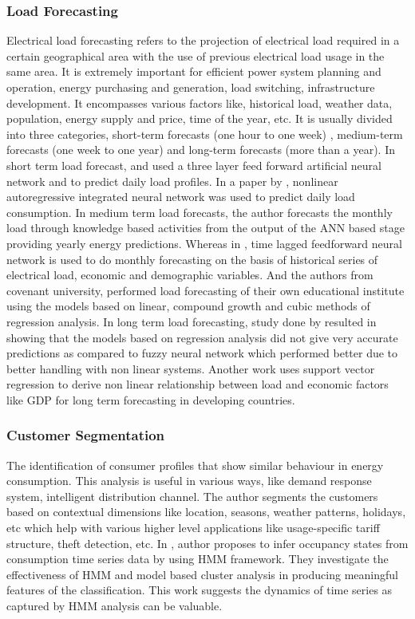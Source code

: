 \documentclass{sig-alternate}
\begin{document}
\subsubsection{Load Forecasting}
Electrical load forecasting refers to the projection of electrical load required in a certain geographical area with the use of previous electrical load usage in the same area. It is extremely important for efficient power system planning and operation, energy purchasing and generation, load switching, infrastructure development. It encompasses various factors like, historical load, weather data, population, energy supply and price, time of the year, etc.
It is usually divided into three categories, short-term forecasts (one hour to one week) , medium-term forecasts (one week to one year) and long-term forecasts (more than a year).
In short term load forecast, \cite{Bakirtzis} and \cite{Chen} used a three layer feed forward artificial neural network and to predict daily load profiles. In a paper by \cite{Chow}, nonlinear autoregressive integrated neural network was used to predict daily load consumption.
In medium term load forecasts, the author forecasts \cite{Falvo} the monthly load through knowledge based activities from the output of the ANN based stage providing yearly energy predictions. Whereas in \cite{bassi}, time lagged feedforward neural network is used to do monthly forecasting on the basis of historical series of electrical load, economic and demographic variables. And the authors from covenant university, \cite{samuel} performed load forecasting of their own educational institute using the models based on linear, compound growth and cubic methods of regression analysis.
In long term load forecasting, study done by \cite{Daneshi} resulted in showing that the models based on regression analysis did not give very accurate predictions as compared to fuzzy neural network which performed better due to better handling with non linear systems. Another work  \cite{Zhang} uses support vector regression to derive non linear relationship between load and economic factors like GDP for long term forecasting in developing countries.



\subsubsection{Customer Segmentation}
The identification of consumer profiles that show similar behaviour in energy consumption. This analysis is useful in various ways, like demand response system, intelligent distribution channel. The author \cite{wijaya2014consumer} segments the customers based on contextual dimensions like location, seasons, weather patterns, holidays, etc which help with various higher level applications like usage-specific tariff structure, theft detection, etc. In \cite{Albert}, author proposes to infer occupancy states from consumption time series data by using HMM framework. They investigate the effectiveness of HMM and model based cluster analysis in producing meaningful features of the classification. This work suggests the dynamics of time series as captured by HMM analysis can be valuable.
\end{document}
